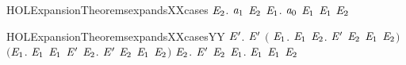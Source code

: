 \begin{SaveVerbatim}{HOLExpansionTheoremsexpandsXXcases}
       \HOLSymConst{\HOLTokenForall{}}\ensuremath{\HOLBoundVar{E}\sb{\mathrm{2}}}. \ensuremath{\HOLBoundVar{a}\sb{\mathrm{1}}} \HOLTokenTransBegin\HOLConst{\ensuremath{\tau}}\HOLTokenTransEnd \ensuremath{\HOLBoundVar{E}\sb{\mathrm{2}}} \HOLSymConst{\HOLTokenImp{}} \HOLSymConst{\HOLTokenExists{}}\ensuremath{\HOLBoundVar{E}\sb{\mathrm{1}}}. \ensuremath{\HOLBoundVar{a}\sb{\mathrm{0}}} \HOLTokenWeakTransBegin\HOLConst{\ensuremath{\tau}}\HOLTokenWeakTransEnd \ensuremath{\HOLBoundVar{E}\sb{\mathrm{1}}} \HOLSymConst{\HOLTokenConj{}} \ensuremath{\HOLBoundVar{E}\sb{\mathrm{1}}}  \ensuremath{\HOLBoundVar{E}\sb{\mathrm{2}}}
\end{SaveVerbatim}
\newcommand{\HOLExpansionTheoremsexpandsXXcases}{\UseVerbatim{HOLExpansionTheoremsexpandsXXcases}}
\begin{SaveVerbatim}{HOLExpansionTheoremsexpandsXXcasesYY}
\HOLTokenTurnstile{} \HOLSymConst{\HOLTokenForall{}} \ensuremath{\HOLBoundVar{E}\sp{\prime}}.
         \ensuremath{\HOLBoundVar{E}\sp{\prime}} \HOLSymConst{\HOLTokenEquiv{}}
       \ensuremath{(}\HOLSymConst{\HOLTokenForall{}} \ensuremath{\HOLBoundVar{E}\sb{\mathrm{1}}}.
             \HOLTokenTransBegin{} \HOLTokenTransEnd \ensuremath{\HOLBoundVar{E}\sb{\mathrm{1}}} \HOLSymConst{\HOLTokenImp{}}
            \HOLSymConst{\HOLTokenExists{}}\ensuremath{\HOLBoundVar{E}\sb{\mathrm{2}}}. \ensuremath{\HOLBoundVar{E}\sp{\prime}} \HOLTokenTransBegin{} \HOLTokenTransEnd \ensuremath{\HOLBoundVar{E}\sb{\mathrm{2}}} \HOLSymConst{\HOLTokenConj{}} \ensuremath{\HOLBoundVar{E}\sb{\mathrm{1}}}  \ensuremath{\HOLBoundVar{E}\sb{\mathrm{2}}}\ensuremath{)} \HOLSymConst{\HOLTokenConj{}}
       \ensuremath{(}\HOLSymConst{\HOLTokenForall{}}\ensuremath{\HOLBoundVar{E}\sb{\mathrm{1}}}.
             \HOLTokenTransBegin\HOLConst{\ensuremath{\tau}}\HOLTokenTransEnd \ensuremath{\HOLBoundVar{E}\sb{\mathrm{1}}} \HOLSymConst{\HOLTokenImp{}}
            \ensuremath{\HOLBoundVar{E}\sb{\mathrm{1}}}  \ensuremath{\HOLBoundVar{E}\sp{\prime}} \HOLSymConst{\HOLTokenDisj{}} \HOLSymConst{\HOLTokenExists{}}\ensuremath{\HOLBoundVar{E}\sb{\mathrm{2}}}. \ensuremath{\HOLBoundVar{E}\sp{\prime}} \HOLTokenTransBegin\HOLConst{\ensuremath{\tau}}\HOLTokenTransEnd \ensuremath{\HOLBoundVar{E}\sb{\mathrm{2}}} \HOLSymConst{\HOLTokenConj{}} \ensuremath{\HOLBoundVar{E}\sb{\mathrm{1}}}  \ensuremath{\HOLBoundVar{E}\sb{\mathrm{2}}}\ensuremath{)} \HOLSymConst{\HOLTokenConj{}}
       \HOLSymConst{\HOLTokenForall{}} \ensuremath{\HOLBoundVar{E}\sb{\mathrm{2}}}. \ensuremath{\HOLBoundVar{E}\sp{\prime}} \HOLTokenTransBegin{}\HOLTokenTransEnd \ensuremath{\HOLBoundVar{E}\sb{\mathrm{2}}} \HOLSymConst{\HOLTokenImp{}} \HOLSymConst{\HOLTokenExists{}}\ensuremath{\HOLBoundVar{E}\sb{\mathrm{1}}}.  \HOLTokenWeakTransBegin{}\HOLTokenWeakTransEnd \ensuremath{\HOLBoundVar{E}\sb{\mathrm{1}}} \HOLSymConst{\HOLTokenConj{}} \ensuremath{\HOLBoundVar{E}\sb{\mathrm{1}}}  \ensuremath{\HOLBoundVar{E}\sb{\mathrm{2}}}
\end{SaveVerbatim}
